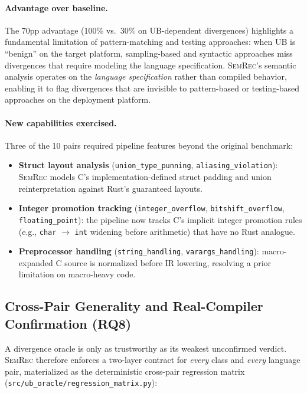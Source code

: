 \documentclass[10pt,a4paper]{article}
\begin{document}
\paragraph{Advantage over baseline.}
The 70pp advantage (100\% vs.\ 30\% on UB-dependent divergences)
highlights a fundamental limitation of pattern-matching and testing
approaches: when UB is
``benign'' on the target platform, sampling-based and syntactic
approaches miss divergences that require modeling the language
specification.
\textsc{SemRec}'s semantic analysis operates on the \emph{language
specification} rather than compiled behavior, enabling it to flag
divergences that are invisible to pattern-based or testing-based
approaches on the deployment platform.

\paragraph{New capabilities exercised.}
Three of the 10 pairs required pipeline features beyond the original
benchmark:
\begin{itemize}[nosep]
  \item \textbf{Struct layout analysis} (\texttt{union\_type\_punning},
    \texttt{aliasing\_violation}): \textsc{SemRec} models C's
    implementation-defined struct padding and union reinterpretation
    against Rust's guaranteed layouts.
  \item \textbf{Integer promotion tracking} (\texttt{integer\_overflow},
    \texttt{bitshift\_overflow}, \texttt{floating\_point}): the pipeline now tracks
    C's implicit integer promotion rules (e.g., \texttt{char}
    $\to$ \texttt{int} widening before arithmetic) that have no Rust
    analogue.
  \item \textbf{Preprocessor handling} (\texttt{string\_handling},
    \texttt{varargs\_handling}): macro-expanded C source is normalized
    before IR lowering, resolving a prior limitation on macro-heavy
    code.
\end{itemize}


\subsection{Cross-Pair Generality and Real-Compiler Confirmation
(RQ8)}\label{sec:eval-matrix}

A divergence oracle is only as trustworthy as its weakest unconfirmed verdict.
\textsc{SemRec} therefore enforces a two-layer contract for \emph{every} class
and \emph{every} language pair, materialized as the deterministic cross-pair
regression matrix (\texttt{src/ub\_oracle/regression\_matrix.py}):
\end{document}
